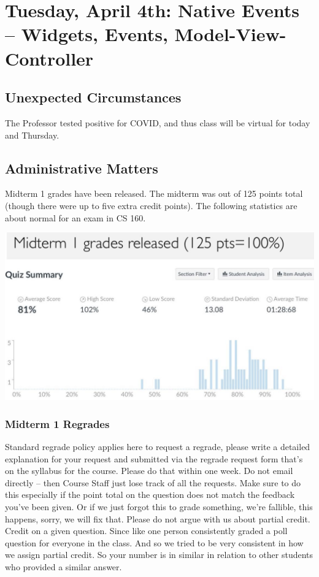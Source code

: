 \section{Tuesday, April 4th: Native Events -- Widgets, Events, Model-View-Controller}
\subsection{Unexpected Circumstances}
The Professor tested positive for COVID, and thus class will be virtual for today and Thursday.

\subsection{Administrative Matters}
Midterm 1 grades have been released. The midterm was out of 125 points total (though there were up to five extra credit points). The following statistics are about normal for an exam in CS 160.
\begin{center}
    \includegraphics[scale=0.25]
    {lectures/wk11/img/midterm_grades.png}
\end{center}

\subsubsection{Midterm 1 Regrades}
Standard regrade policy applies here to request a regrade, please write a detailed explanation for your request and submitted via the regrade request form that's on the syllabus for the course. Please do that within one week. Do not email directly -- then Course Staff just lose track of all the requests. Make sure to do this especially if the point total on the question does not match the feedback you've been given. Or if we just forgot this to grade something, we're fallible, this happens, sorry, we will fix that. Please do not argue with us about partial credit. Credit on a given question. Since like one person consistently graded a poll question for everyone in the class. And so we tried to be very consistent in how we assign partial credit. So your number is in similar in relation to other students who provided a similar answer. 

